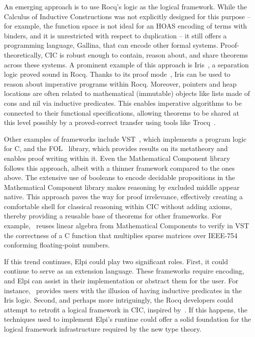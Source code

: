 \documentclass{these-ISSS}
\begin{document}
An emerging approach is to use Rocq's logic as the logical framework. While the
Calculus of Inductive Constructions was not explicitly designed for this
purpose -- for example, the function space is not ideal for an HOAS encoding of
terms with binders, and it is unrestricted with respect to duplication -- it still
offers a programming language, Gallina, that can encode other formal systems.
Proof-theoretically, CIC is robust enough to contain, reason about, and share
theorems across these systems. A prominent example of this approach is
Iris~\cite{10.1007/978-3-662-54434-1_26}, a separation logic proved sound in
Rocq. Thanks to its proof mode~\cite{IPM}, Iris can be used to reason about
imperative programs within Rocq. Moreover, pointers and heap locations are often
related to mathematical (immutable) objects like lists made of cons and nil via
inductive predicates. This enables imperative algorithms to be connected to
their functional specifications, allowing theorems to be shared at this level
possibly by 
a proved-correct transfer using tools like Trocq~\cite{10.1007/978-3-031-57262-3_10}.

Other examples of frameworks include VST~\cite{VST}, which implements a program
logic for C, and the FOL~\cite{FOL} library, which provides results on its
metatheory and enables proof writing within it. Even the Mathematical Component
library~\cite{assia_mahboubi_2022_7118596} follows this approach, albeit with
a thinner framework compared to the ones above. The extensive use of booleans to encode
decidable propositions in the Mathematical Component library makes reasoning by
excluded middle appear native. This approach paves the way for proof irrelevance,
effectively creating a comfortable shell for classical reasoning within CIC
without adding axioms, thereby providing a reusable base of theorems for other
frameworks. For example,~\cite{10461453} reuses linear algebra from Mathematical
Components to verify in VST the correctness of a C function that multiplies sparse
matrices over IEEE-754 conforming floating-point numbers.

If this trend continues, Elpi could play two significant roles. First, it could
continue to serve as an extension language. These frameworks require encoding,
and Elpi can assist in their implementation or abstract them for the user. For
instance,~\cite{krebbers25} provides users with the illusion of having inductive
predicates in the Iris logic. Second, and perhaps more intriguingly, the Rocq
developers could
attempt to retrofit a logical framework in CIC, inspired
by~\cite{concon}. If this happens, the techniques used to implement Elpi's
runtime could offer a solid foundation for the logical framework infrastructure
required by the new type theory.


\backmatter

\printindex[concept]
\printbibliography[title={Our Bibliography}, keyword=me]
\printbibliography[title={Bibliography}, keyword=they]
\end{document}
